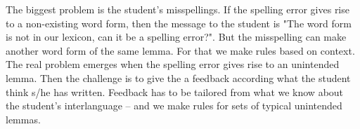\documentclass[11pt]{article}
\begin{document}
%

The biggest problem is the student's misspellings. If the spelling error gives rise to a non-existing word form, then the message to the student is "The word form is not in our lexicon, can it be a spelling error?". But the misspelling can make another word form of the same lemma. For that we make rules based on context. The real problem emerges when the spelling error gives rise to an unintended lemma. Then the challenge is to give the a feedback according what the student think s/he has written. Feedback has to be tailored from what we know about the student’s interlanguage – and we make rules for sets of typical unintended lemmas.
\end{document}
